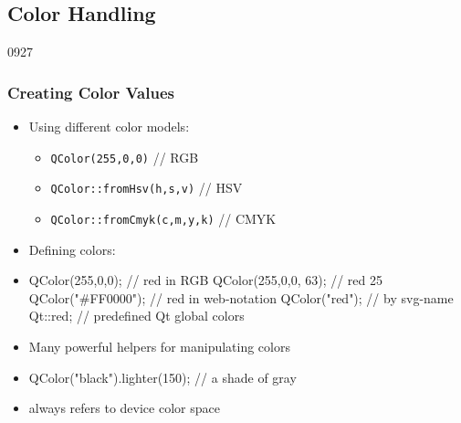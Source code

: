 %
%
%
%

\subsection{Color Handling}


\begin{slide}[fragile]{0927}\frametitle{Creating Color Values}
\begin{itemize}
  \item Using different color models:
  \begin{itemize}
    \item \texttt{QColor(255,0,0)} // RGB
    \item \texttt{QColor::fromHsv(h,s,v)} // HSV
    \item \texttt{QColor::fromCmyk(c,m,y,k)} // CMYK
  \end{itemize}
  \item Defining colors:
  \item[] \begin{cpp}
QColor(255,0,0); // red in RGB
QColor(255,0,0, 63); // red 25%
QColor("#FF0000"); // red in web-notation
QColor("red"); // by svg-name
Qt::red; // predefined Qt global colors
    \end{cpp}
  \item Many powerful helpers for manipulating colors
  \item[] \begin{cpp}
QColor("black").lighter(150); // a shade of gray
    \end{cpp}
  \item {} always refers to device color space
\end{itemize}
\end{slide}

